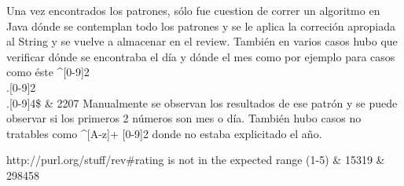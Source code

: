 Una vez encontrados los patrones, sólo fue cuestion de correr un algoritmo en Java dónde se contemplan todo los patrones y se 
le aplica la correción apropiada al String y se vuelve a almacenar en el review.
También en varios casos hubo que verificar dónde se encontraba el día y dónde el mes como por ejemplo para casos como éste ^[0-9]{2}\\.[0-9]{2}\\.[0-9]{4}\$ & 2207 
Manualmente se observan los resultados de ese patrón y se puede observar si los primeros 2 números son mes o día.
También hubo casos no tratables como ^[A-z]+ [0-9]{2} donde no estaba explicitado el año.

http://purl.org/stuff/rev\#rating is not in the expected range (1-5) & 15319 & 298458\\